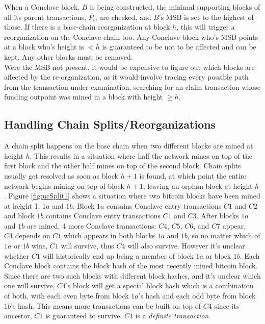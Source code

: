 \documentclass{report}
\begin{document}
			When a Conclave block, $B$ is being constructed, the minimal supporting blocks  of all its parent transactions, $P_{i}$, are checked, and $B$'s MSB is set to the highest of those. If there is a base-chain reorganization at block $h$, this will trigger a reorganization on the Conclave chain too. Any Conclave block who's MSB points at a block who's height is $< h$ is guaranteed to be not to be affected and can be kept. Any other blocks must be removed. \\
			
			Were the MSB not present, it would be expensive to figure out which blocks are affected by the re-organization, as it would involve tracing every possible path from the transaction under examination, searching for an claim transaction whose funding outpoint was mined in a block with height $\ge h$.
			
		\subsection{Handling Chain Splits/Reorganizations} 
		A chain split   happens on the base chain when two different blocks are mined at height $h$. This results in a situation where half the network mines on top of the first block and the other half mines  on top of the second block. Chain splits usually get resolved as soon as block $h+1$ is found, at which point the entire network begins mining on top of block $h+1$, leaving an orphan block  at height $h$. Figure \ref{fig:ucSplit1} shows a situation where two bitcoin blocks have been mined at height 1: $1a$ and $1b$. Block $1a$ contains Conclave entry transactions $C1$ and $C2$ and block $1b$ contains Conclave entry transactions $C1$ and $C3$. After blocks $1a$ and $1b$ are mined, 4 more Conclave transactions: $C4$, $C5$, $C6$, and $C7$ appear. \\
		
		$C4$ depends on $C1$ which appears in both blocks $1a$ and $1b$, so no matter which of $1a$ or $1b$ wins, $C1$ will survive, thus $C4$ will also survive. However it's unclear whether $C1$ will historically end up being a member of block $1a$ or block $1b$. Each Conclave block contains the block hash of the most recently mined bitcoin block. Since there are two such blocks with different block hashes, and it's unclear which one will survive, $C4$'s block will get a special block hash which is a combination of both, with each even byte from block $1a$'s hash and each odd byte from block $1b$'s hash. This means more transactions can be built on top of $C4$ since its ancestor, $C1$ is guaranteed to survive. $C4$ is a \textit{definite transaction}.\\
		
\end{document}
